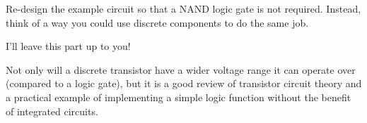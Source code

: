

Re-design the example circuit so that a NAND logic gate is not required.  Instead, think of a way you could use discrete components to do the same job.







I'll leave this part up to you!







Not only will a discrete transistor have a wider voltage range it can operate over (compared to a logic gate), but it is a good review of transistor circuit theory and a practical example of implementing a simple logic function without the benefit of integrated circuits.



